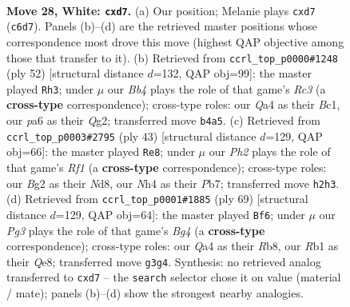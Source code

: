 \documentclass[11pt]{article}
\begin{document}
\clearpage

\begin{figure}[p]\centering
\begin{subfigure}{0.46\textwidth}\centering
\resizebox{\linewidth}{!}{%
\newchessgame
\chessboard[
  setfen={r1bn1k2/1p1p1pp1/p1Pq4/2r3np/QB5N/4P1P1/PP2RPBP/1R4K1 w - - 1 28},
  showmover=false,
  pgfstyle=straightmove, color=movearrow, markmove={c6-d7}
]}
\caption{}
\end{subfigure}\hfill
\begin{subfigure}{0.46\textwidth}\centering
\resizebox{\linewidth}{!}{%
\newchessgame
\chessboard[
  setfen={2r1rbk1/5p1p/3p2p1/ppq2PP1/2nN4/P1R5/1PP3QP/1KBR4 w - - 0 27},
  showmover=false,
  pgfstyle=straightmove, color=movearrow, markmove={c3-h3}
]}
\caption{}
\end{subfigure}
\\[4pt]
\begin{subfigure}{0.46\textwidth}\centering
\resizebox{\linewidth}{!}{%
\newchessgame
\chessboard[
  setfen={r2n1rk1/1pq1pp1p/4b1p1/p3N2P/2P2Q2/6P1/3RPPB1/2R3K1 b - - 2 22},
  showmover=false,
  pgfstyle=straightmove, color=movearrow, markmove={f8-e8}
]}
\caption{}
\end{subfigure}\hfill
\begin{subfigure}{0.46\textwidth}\centering
\resizebox{\linewidth}{!}{%
\newchessgame
\chessboard[
  setfen={1r2q1k1/npr2pp1/p3p2p/2Np2b1/PP1P2P1/3QP2P/1R1B1PK1/2R5 b - - 8 35},
  showmover=false,
  pgfstyle=straightmove, color=movearrow, markmove={g5-f6}
]}
\caption{}
\end{subfigure}
\caption{\textbf{Move 28, White: \texttt{cxd7}.} (a) Our position; Melanie plays \texttt{cxd7} (\texttt{c6d7}). Panels (b)--(d) are the retrieved master positions whose correspondence most drove this move (highest QAP objective among those that transfer to it). (b) Retrieved from \texttt{ccrl\_top\_p0000\#1248} (ply 52) [structural distance $d$=132, QAP obj=99]: the master played \texttt{Rh3}; under $\mu$ our \emph{Bb4} plays the role of that game's \emph{Rc3} (a \textbf{cross-type} correspondence); cross-type roles: our \emph{Q}a4 as their \emph{B}c1, our \emph{p}a6 as their \emph{Q}g2; transferred move \texttt{b4a5}. (c) Retrieved from \texttt{ccrl\_top\_p0003\#2795} (ply 43) [structural distance $d$=129, QAP obj=66]: the master played \texttt{Re8}; under $\mu$ our \emph{Ph2} plays the role of that game's \emph{Rf1} (a \textbf{cross-type} correspondence); cross-type roles: our \emph{B}g2 as their \emph{N}d8, our \emph{N}h4 as their \emph{P}b7; transferred move \texttt{h2h3}. (d) Retrieved from \texttt{ccrl\_top\_p0001\#1885} (ply 69) [structural distance $d$=129, QAP obj=64]: the master played \texttt{Bf6}; under $\mu$ our \emph{Pg3} plays the role of that game's \emph{Bg4} (a \textbf{cross-type} correspondence); cross-type roles: our \emph{Q}a4 as their \emph{R}b8, our \emph{R}b1 as their \emph{Q}e8; transferred move \texttt{g3g4}. Synthesis: no retrieved analog transferred to \texttt{cxd7} -- the \texttt{search} selector chose it on value (material / mate); panels (b)--(d) show the strongest nearby analogies.}
\label{fig:thought-m54}
\end{figure}
\end{document}
